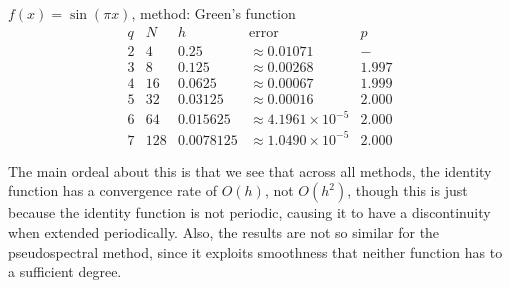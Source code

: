 \documentclass[12pt,letterpaper]{article}
\begin{document}
    $f(x)=\sin (\pi x)$, method: Green's function
    \[
        \begin{array}{c|c|c|c|c}
        q & N & h & \text{error} & p  \\ \hline
        2 & 4 & 0.25 & \approx 0.01071 & - \\
        3 & 8 & 0.125 & \approx0.00268 & 1.997  \\
        4 & 16 & 0.0625 & \approx0.00067 & 1.999 \\
        5 & 32 & 0.03125 & \approx 0.00016 &  2.000 \\
        6 & 64 & 0.015625 & \approx 4.1961 \times 10^{-5} & 2.000 \\
        7 & 128 & 0.0078125& \approx 1.0490 \times 10^{-5} & 2.000 
        \end{array}
    \]

    The main ordeal about this is that we see that across all methods, the identity function has a convergence rate of $O(h)$, not $O(h^2)$, though this is just because the identity function is not periodic, causing it to have a discontinuity when extended periodically. Also, the results are not so similar for the pseudospectral method, since it exploits smoothness that neither function has to a sufficient degree.
    
\end{document}
